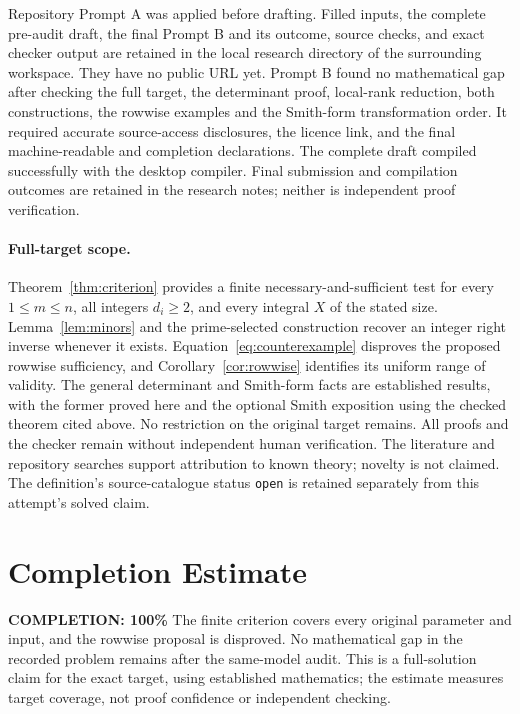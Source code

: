 \documentclass[11pt]{article}
\begin{document}
Repository Prompt A was applied before drafting. Filled inputs, the
complete pre-audit draft, the final Prompt B and its outcome, source
checks, and exact checker output are retained in the local research
directory of
the surrounding workspace. They have no public URL yet. Prompt B found no mathematical gap after checking the full target,
the determinant proof, local-rank reduction, both constructions, the
rowwise examples and the Smith-form transformation order. It required
accurate source-access disclosures, the licence link, and the final
machine-readable and completion declarations. The complete draft
compiled successfully with the desktop compiler. Final submission and
compilation outcomes are retained in the research notes; neither is
independent proof verification.

\paragraph{Full-target scope.}
Theorem~\ref{thm:criterion} provides a finite necessary-and-sufficient
test for every $1\le m\le n$, all integers $d_i\ge2$, and every
integral $X$ of the stated size. Lemma~\ref{lem:minors} and the
prime-selected construction recover an integer right inverse whenever
it exists. Equation~\eqref{eq:counterexample} disproves the proposed
rowwise sufficiency, and Corollary~\ref{cor:rowwise} identifies its
uniform range of validity. The general determinant and Smith-form
facts are established results, with the former proved here and the
optional Smith exposition using the checked theorem cited above.
No restriction on the original target remains. All proofs and the
checker remain without independent human verification. The literature
and repository searches support attribution to known theory; novelty
is not claimed. The definition's source-catalogue status \texttt{open}
is retained separately from this attempt's solved claim.

\section{Completion Estimate}
\noindent\textbf{COMPLETION: 100\%}
The finite criterion covers every original parameter and input, and the
rowwise proposal is disproved. No mathematical gap in the recorded
problem remains after the same-model audit. This is a full-solution
claim for the exact target, using established mathematics; the estimate
measures target coverage, not proof confidence or independent checking.
\end{document}
